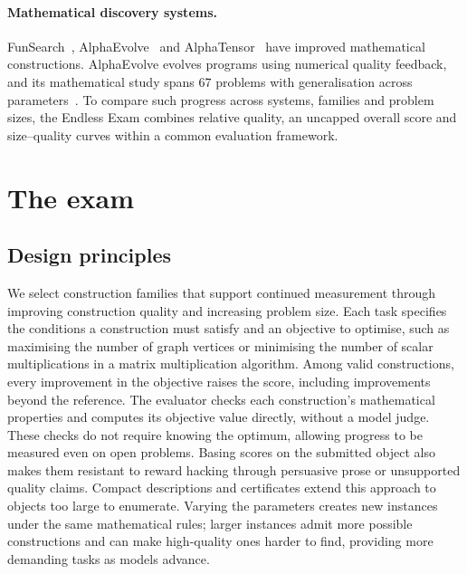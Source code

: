 \documentclass{article}
\begin{document}
\begin{table}[t]
\centering\footnotesize\setlength{\tabcolsep}{2.5pt}
\renewcommand{\arraystretch}{1.06}

\caption{Comparison of mathematical benchmarks and problem collections, using the cited releases. Unsolved indicates inclusion of open research targets. Our 69 instances span 14 families. Scalable denotes larger instances generated by increasing parameters under the same rules. $^{*}$IMProofBench's main proofs are human-graded; follow-up answers are automatically checked.}
\label{tab:benchmark_comparison}
\end{table}

\paragraph{Mathematical discovery systems.}
FunSearch~\citep{romera2024funsearch}, AlphaEvolve~\citep{novikov2025alphaevolve} and AlphaTensor~\citep{fawzi2022alphatensor} have improved mathematical constructions. AlphaEvolve evolves programs using numerical quality feedback, and its mathematical study spans 67 problems with generalisation across parameters~\citep{georgiev2025exploration}. To compare such progress across systems, families and problem sizes, the Endless Exam combines relative quality, an uncapped overall score and size--quality curves within a common evaluation framework.

\section{The exam}
\label{sec:exam}

\subsection{Design principles}
\label{sec:principles}
We select construction families that support continued measurement through improving construction quality and increasing problem size. Each task specifies the conditions a construction must satisfy and an objective to optimise, such as maximising the number of graph vertices or minimising the number of scalar multiplications in a matrix multiplication algorithm. Among valid constructions, every improvement in the objective raises the score, including improvements beyond the reference. The evaluator checks each construction's mathematical properties and computes its objective value directly, without a model judge. These checks do not require knowing the optimum, allowing progress to be measured even on open problems. Basing scores on the submitted object also makes them resistant to reward hacking through persuasive prose or unsupported quality claims. Compact descriptions and certificates extend this approach to objects too large to enumerate. Varying the parameters creates new instances under the same mathematical rules; larger instances admit more possible constructions and can make high-quality ones harder to find, providing more demanding tasks as models advance.
\end{document}
